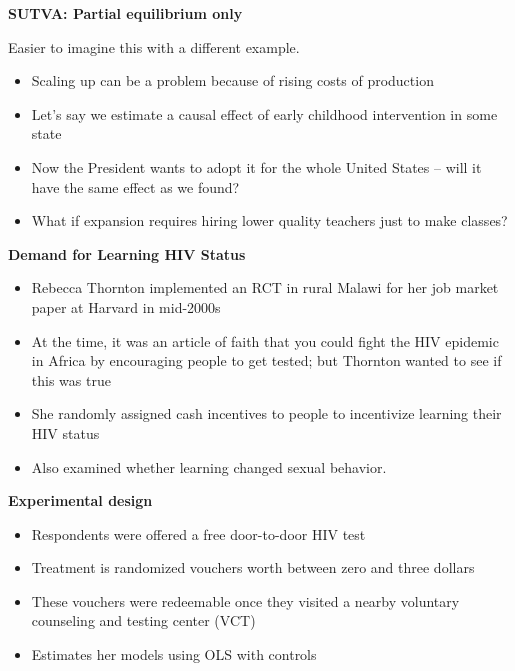 \documentclass[notes=show]{beamer}
\begin{document}
\begin{frame}[plain]
	\begin{center}
	\textbf{SUTVA: Partial equilibrium only}
	\end{center}
	
Easier to imagine this with a different example.  
	\begin{itemize}
	\item Scaling up can be a problem because of rising costs of production
	\item Let's say we estimate a causal effect of early childhood intervention in some state
	\item Now the President wants to adopt it for the whole United States -- will it have the same effect as we found?
	\item What if expansion requires hiring lower quality teachers just to make classes?
	\end{itemize}
\end{frame}


\begin{frame}[plain]
\begin{center}
\textbf{Demand for Learning HIV Status}
\end{center}


\begin{itemize}
\item Rebecca Thornton implemented an RCT in rural Malawi for her job market paper at Harvard in mid-2000s
\item At the time, it was an article of faith that you could fight the HIV epidemic in Africa by encouraging people to get tested; but Thornton wanted to see if this was true
\item She randomly assigned cash incentives to people to incentivize learning their HIV status 
\item Also examined whether learning changed sexual behavior.
\end{itemize}

\end{frame}

\begin{frame}[plain]
\begin{center}
\textbf{Experimental design}
\end{center}

\begin{itemize}
\item Respondents were offered a free door-to-door HIV test
\item Treatment is randomized vouchers worth between zero and three dollars
\item These vouchers were redeemable once they visited a nearby voluntary counseling and testing center (VCT)
\item Estimates her models using OLS with controls
\end{itemize}

\end{frame}
\end{document}

